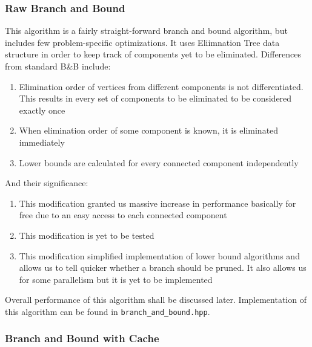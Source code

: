\subsubsection{Raw Branch and Bound}
This algorithm is a fairly straight-forward branch and bound algorithm, but includes few problem-specific optimizations. It uses Eliimnation Tree data structure in order to keep track of components yet to be eliminated. Differences from standard B\&B include:
\begin{enumerate}
	\item Elimination order of vertices from different components is not differentiated. This results in every set of components to be eliminated to be considered exactly once
	\item When elimination order of some component is known, it is eliminated immediately
	\item Lower bounds are calculated for every connected component independently
\end{enumerate}
And their significance:
\begin{enumerate}
	\item This modification granted us massive increase in performance basically for free due to an easy access to each connected component
	\item This modification is yet to be tested
	\item This modification simplified implementation of lower bound algorithms and allows us to tell quicker whether a branch should be pruned. It also allows us for some parallelism but it is yet to be implemented
\end{enumerate}
Overall performance of this algorithm shall be discussed later. Implementation of this algorithm can be found in \texttt{branch\_and\_bound.hpp}.
\subsubsection{Branch and Bound with Cache}
